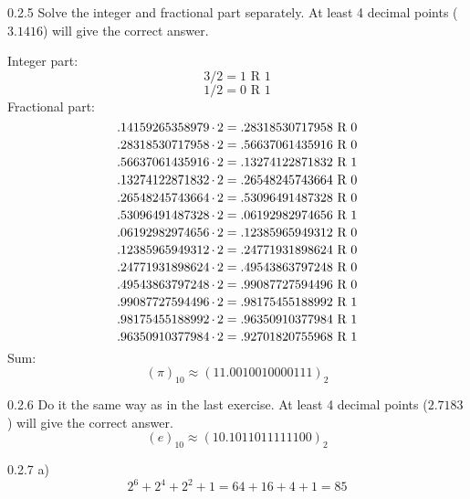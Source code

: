 \begin{task}{0.2.5}
Solve the integer and fractional part separately. At least 4 decimal points ($3.1416$) will give the correct answer.

Integer part:
\[3/2=1\text{ R }1\]
\[1/2=0\text{ R }1\]
Fractional part:
\[.14159265358979\operatorname{\cdot}2=.28318530717958\text{ R }0\]
\[.28318530717958\operatorname{\cdot}2=.56637061435916\text{ R }0\]
\[.56637061435916\operatorname{\cdot}2=.13274122871832\text{ R }1\]
\[.13274122871832\operatorname{\cdot}2=.26548245743664\text{ R }0\]
\[.26548245743664\operatorname{\cdot}2=.53096491487328\text{ R }0\]
\[.53096491487328\operatorname{\cdot}2=.06192982974656\text{ R }1\]
\[.06192982974656\operatorname{\cdot}2=.12385965949312\text{ R }0\]
\[.12385965949312\operatorname{\cdot}2=.24771931898624\text{ R }0\]
\[.24771931898624\operatorname{\cdot}2=.49543863797248\text{ R }0\]
\[.49543863797248\operatorname{\cdot}2=.99087727594496\text{ R }0\]
\[.99087727594496\operatorname{\cdot}2=.98175455188992\text{ R }1\]
\[.98175455188992\operatorname{\cdot}2=.96350910377984\text{ R }1\]
\[.96350910377984\operatorname{\cdot}2=.92701820755968\text{ R }1\]
Sum:
\[(\pi)_{10}\approx(11.0010010000111)_2\]
\end{task}

\begin{task}{0.2.6}
Do it the same way as in the last exercise. At least 4 decimal points ($2.7183$) will give the correct answer.
\[(e)_{10}\approx(10.1011011111100)_2\]
\end{task}

\begin{task}{0.2.7 a)}
\[2^6+2^4+2^2+1=64+16+4+1=85\]
\end{task}